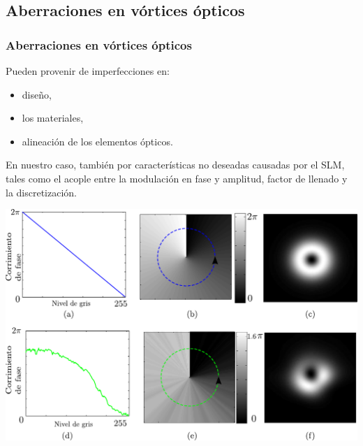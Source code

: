 \documentclass[serif,8pt]{beamer}
\begin{document}
		\subsection{Aberraciones en vórtices ópticos}
		\begin{frame}
		\frametitle{Aberraciones en vórtices ópticos}
		
		\begin{multicols}{2}
		Pueden provenir de imperfecciones en: 
			\begin{itemize}
			\item diseño,
			\item los materiales,
			\item alineación de los elementos ópticos.
			\end{itemize}
			
		\newpage
		\justifying
			En nuestro caso, también por características no deseadas causadas por  el SLM, tales como el acople entre la modulación en fase y amplitud, factor de llenado y la discretización.

		\end{multicols}

		\centering
		\includegraphics[scale=0.35]{img/ovsimreal.pdf}
		
		\end{frame}		
		
\end{document}
